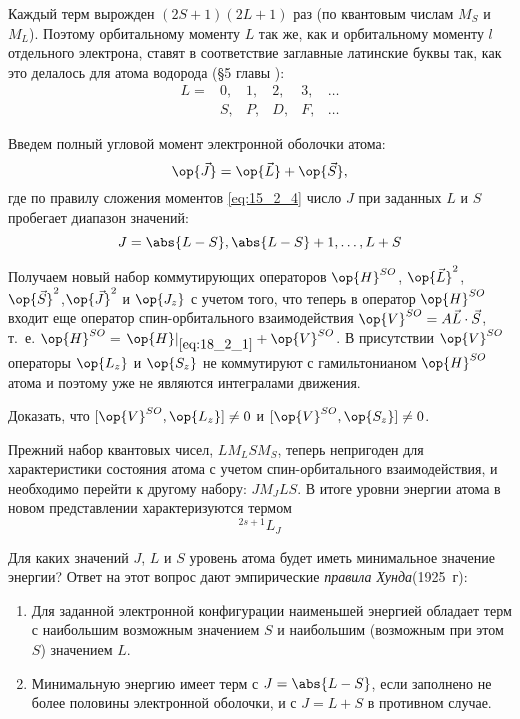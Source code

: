 Каждый терм вырожден $(2S+1)(2L+1)$ раз (по квантовым числам $M_S$ и $M_L$). Поэтому орбитальному моменту $L$ так же, как и орбитальному моменту $l$ отдельного электрона, ставят в соответствие заглавные латинские буквы так, как это делалось для атома водорода (\S 5 главы ):
$$ 
\begin{matrix}
L= & 0, & 1, & 2,& 3, & \dots \\
      & S, & P, & D, & F, & \dots 
\end{matrix}
$$

Введем полный угловой момент электронной оболочки атома:
\begin{equation}
\label{eq:18_3_1}
\op{\vec{J}} = \op{\vec{L}} + \op{\vec{S}},
\end{equation}
где по правилу сложения моментов \eqref{eq:15_2_4} число $J$ при заданных $L$ и $S$ пробегает диапазон значений:
$$
J = \abs{L-S}, \abs{L-S} + 1, \dots, L+S
$$

Получаем новый набор коммутирующих операторов $\op{H}^{SO}$, $\op{\vec{L}}^2$, $\op{\vec{S}}^2$,$\op{\vec{J}}^2$ и $\op{J_z}$ с учетом того, что теперь в оператор $\op{H}^{SO}$ входит еще оператор спин-орбитального взаимодействия $\op{V}^{SO} = A \vec{L} \cdot \vec{S}$, т.~е. $\op{H}^{SO} = \left .\op{H} \right |_{\eqref{eq:18_2_1}} + \op{V}^{SO}$. В присутствии $\op{V}^{SO}$ операторы $\op{L_z}$ и $\op{S_z}$ не коммутируют с гамильтонианом $\op{H}^{SO}$ атома и поэтому уже не являются интегралами движения.

\begin{excr}
Доказать, что $[\op{V}^{SO}, \op{L_z}] \neq 0$ и $[\op{V}^{SO}, \op{S_z}] \neq 0$.
\end{excr}

Прежний набор квантовых чисел, $L M_L S M_S$, теперь непригоден для характеристики состояния атома с учетом спин-орбитального взаимодействия, и необходимо перейти к другому набору: $J M_J L S$. В итоге уровни энергии атома в новом представлении характеризуются термом 
$$
\boxed{^{2s+1}L_J}
$$


Для каких значений $J$, $L$ и $S$ уровень атома будет иметь минимальное значение энергии? Ответ на этот вопрос дают эмпирические {\em правила Хунда}\footnotemark (1925~г):
%
\begin{enumerate}
\item Для заданной электронной конфигурации наименьшей энергией обладает терм с наибольшим возможным значением $S$ и наибольшим (возможным при этом $S$) значением $L$.
\item Минимальную энергию имеет терм с $J = \abs{L-S}$, если заполнено не более половины электронной оболочки, и с $J = L + S$ в противном случае.
\end{enumerate}

